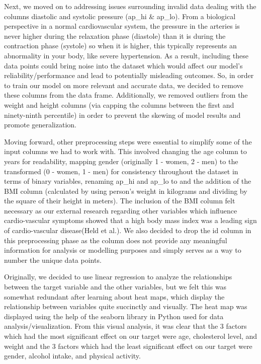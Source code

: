 ﻿\documentclass[12pt]{article}
\begin{document}
Next, we moved on to addressing issues surrounding invalid data dealing with the columns diastolic and systolic pressure (ap\_hi & ap\_lo). From a biological perspective in a normal cardiovascular system, the pressure in the arteries is never higher during the relaxation phase (diastole) than it is during the contraction phase (systole) so when it is higher, this typically represents an abnormality in your body, like severe hypertension. As a result, including these data points could bring noise into the dataset which would affect our model’s reliability/performance and lead to potentially misleading outcomes. So, in order to train our model on more relevant and accurate data, we decided to remove these columns from the data frame. Additionally, we removed outliers from the weight and height columns (via capping the columns between the first and ninety-ninth percentile) in order to prevent the skewing of model results and promote generalization. 

Moving forward, other preprocessing steps were essential to simplify some of the input columns we had to work with. This involved changing the age column to years for readability, mapping gender (originally 1 - women,  2 - men) to the transformed (0 - women, 1 - men) for consistency throughout the dataset in terms of binary variables, renaming ap\_hi and ap\_lo to and the addition of the BMI column (calculated by using person's weight in kilograms and dividing by the square of their height in meters). The inclusion of the BMI column felt necessary as our external research regarding other variables which influence cardio-vascular symptoms showed that a high body mass index was a leading sign of cardio-vascular disease(Held et al.). We also decided to drop the id column in this preprocessing phase as the column does not provide any meaningful information for analysis or modelling purposes and simply serves as a way to number the unique data points.

Originally, we decided to use linear regression to analyze the relationships between the target variable and the other variables, but we felt this was somewhat redundant after learning about heat maps, which display the relationship between variables quite succinctly and visually. The heat map was displayed using the help of the seaborn library in Python used for data analysis/visualization. From this visual analysis, it was clear that the 3 factors which had the most significant effect on our target were age, cholesterol level, and weight and the 3 factors which had the least significant effect on our target were gender, alcohol intake, and physical activity. 
\end{document}
